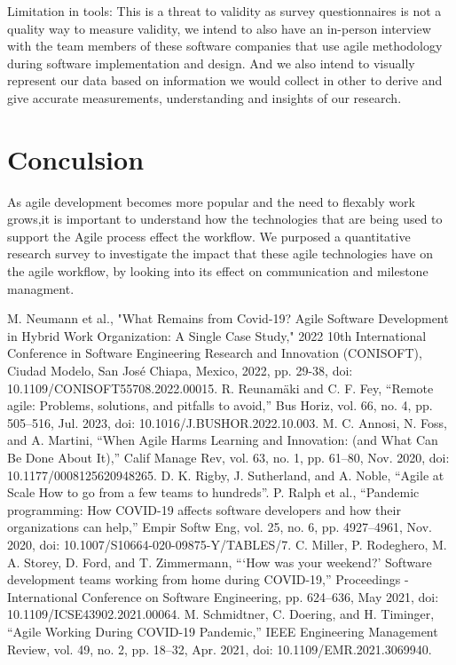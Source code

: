 \documentclass[conference]{IEEEtran}
\begin{document}
Limitation in tools: This is a threat to validity as survey questionnaires is not a quality way to measure validity, we intend to also have an in-person interview with the team members of these software companies that use agile methodology during software implementation and design. And we also intend to visually represent our data based on information we would collect in other to derive and give accurate measurements, understanding and insights of our research.

\section{Conculsion}

As agile development becomes more popular and the need to flexably work grows,it is important to understand how the technologies that are being used to support the Agile process effect the workflow.
We purposed a quantitative research survey to investigate the impact that these agile technologies have on the agile workflow, by looking into its effect on communication and milestone managment. 


\begin{thebibliography}{00}
     M. Neumann et al., "What Remains from Covid-19? Agile Software Development in Hybrid Work Organization: A Single Case Study," 2022 10th International Conference in Software Engineering Research and Innovation (CONISOFT), Ciudad Modelo, San José Chiapa, Mexico, 2022, pp. 29-38, doi: 10.1109/CONISOFT55708.2022.00015.
     R. Reunamäki and C. F. Fey, “Remote agile: Problems, solutions, and pitfalls to avoid,” Bus Horiz, vol. 66, no. 4, pp. 505–516, Jul. 2023, doi: 10.1016/J.BUSHOR.2022.10.003. 
     M. C. Annosi, N. Foss, and A. Martini, “When Agile Harms Learning and Innovation: (and What Can Be Done About It),” Calif Manage Rev, vol. 63, no. 1, pp. 61–80, Nov. 2020, doi: 10.1177/0008125620948265. 
     D. K. Rigby, J. Sutherland, and A. Noble, “Agile at Scale How to go from a few teams to hundreds”.
     P. Ralph et al., “Pandemic programming: How COVID-19 affects software developers and how their organizations can help,” Empir Softw Eng, vol. 25, no. 6, pp. 4927–4961, Nov. 2020, doi: 10.1007/S10664-020-09875-Y/TABLES/7.
     C. Miller, P. Rodeghero, M. A. Storey, D. Ford, and T. Zimmermann, “‘How was your weekend?’ Software development teams working from home during COVID-19,” Proceedings - International Conference on Software Engineering, pp. 624–636, May 2021, doi: 10.1109/ICSE43902.2021.00064. 
     M. Schmidtner, C. Doering, and H. Timinger, “Agile Working During COVID-19 Pandemic,” IEEE Engineering Management Review, vol. 49, no. 2, pp. 18–32, Apr. 2021, doi: 10.1109/EMR.2021.3069940.
\end{thebibliography}
\end{document}
